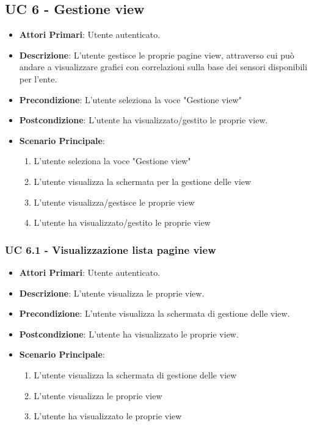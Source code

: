 	\subsection{UC 6 - Gestione view}
		\begin{itemize}
			\item \textbf{Attori Primari}: Utente autenticato.
			\item \textbf{Descrizione}: L'utente gestisce le proprie pagine view, attraverso cui può andare a visualizzare grafici con correlazioni sulla base dei sensori disponibili per l'ente.
			\item \textbf{Precondizione}: L'utente seleziona la voce "Gestione view"
			\item \textbf{Postcondizione}: L'utente ha visualizzato/gestito le proprie view.
			\item \textbf{Scenario Principale}:
			\begin{enumerate}
				\item{L'utente seleziona la voce "Gestione view"}
				\item{L'utente visualizza la schermata per la gestione delle view}
				\item{L'utente visualizza/gestisce le proprie view}
				\item{L'utente ha visualizzato/gestito le proprie view}
			\end{enumerate}	
		\end{itemize}

			\subsubsection{UC 6.1 - Visualizzazione lista pagine view}
			\begin{itemize}
				\item \textbf{Attori Primari}: Utente autenticato.
				\item \textbf{Descrizione}: L'utente visualizza le proprie view.
				\item \textbf{Precondizione}: L'utente visualizza la schermata di gestione delle view.
				\item \textbf{Postcondizione}: L'utente ha visualizzato le proprie view.
				\item \textbf{Scenario Principale}:
				\begin{enumerate}
					\item{L'utente visualizza la schermata di gestione delle view}
					\item{L'utente visualizza le proprie view}
					\item{L'utente ha visualizzato le proprie view}
				\end{enumerate}	
			\end{itemize}


